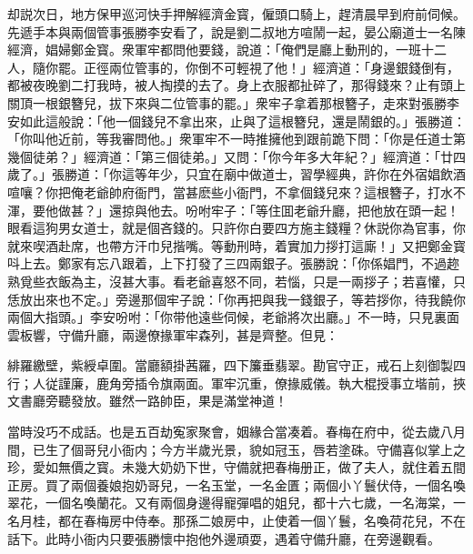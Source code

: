 却説次日，地方保甲巡河快手押解經濟金寳，僱頭口騎上，趕清晨早到府前伺候。先遞手本與兩個管事張勝李安看了，說是劉二叔地方喧鬧一起，晏公廟道士一名陳經濟，娼婦鄭金寳。衆軍牢都問他要錢，說道：「俺們是廳上動刑的，一班十二人，隨你罷。正徑兩位管事的，你倒不可輕視了他！」經濟道：「身邊銀錢倒有，都被夜晚劉二打我時，被人掏摸的去了。身上衣服都扯碎了，那得錢來？止有頭上關頂一根銀簪兒，拔下來與二位管事的罷。」衆牢子拿着那根簪子，走來對張勝李安如此這般說：「他一個錢兒不拿出來，止與了這根簪兒，還是鬧銀的。」張勝道：「你叫他近前，等我審問他。」衆軍牢不一時推擁他到跟前跪下問：「你是任道士第幾個徒弟？」經濟道：「第三個徒弟。」又問：「你今年多大年紀？」經濟道：「廿四歲了。」張勝道：「你這等年少，只宜在廟中做道士，習學經典，許你在外宿娼飲酒喧嚷？你把俺老爺帥府衙門，當甚麽些小衙門，不拿個錢兒來？這根簪子，打水不渾，要他做甚？」還掠與他去。吩咐牢子：「等住囬老爺升廳，把他放在頭一起！眼看這狗男女道士，就是個吝錢的。只許你白要四方施主錢糧？休説你為官事，你就來喫酒赴席，也帶方汗巾兒揩嘴。等動刑時，着實加力拶打這廝！」又把鄭金寳呌上去。鄭家有忘八跟着，上下打發了三四兩銀子。張勝說：「你係娼門，不過趂熟覓些衣飯為主，沒甚大事。看老爺喜怒不同，若惱，只是一兩拶子；若喜懽，只恁放出來也不定。」旁邊那個牢子說：「你再把與我一錢銀子，等若拶你，待我饒你兩個大指頭。」李安吩咐：「你带他遠些伺候，老爺將次出廳。」不一時，只見裏面雲板響，守備升廳，兩邊僚掾軍牢森列，甚是齊整。但見：

\begin{myquote}
緋羅繳壁，紫綬卓圍。當廳額掛茜羅，四下簾垂翡翠。勘官守正，戒石上刻御製四行；人従謹廉，鹿角旁插令旗兩面。軍牢沉重，僚掾威儀。執大棍授事立堦前，挾文書廳旁聽發放。雖然一路帥臣，果是滿堂神道！
\end{myquote}

當時没巧不成話。也是五百劫寃家聚會，姻緣合當凑着。春梅在府中，從去歲八月間，已生了個哥兒小衙内；今方半歲光景，貌如冠玉，唇若塗硃。守備喜似掌上之珍，愛如無價之寳。未幾大奶奶下世，守備就把春梅册正，做了夫人，就住着五間正房。買了兩個養娘抱奶哥兒，一名玉堂，一名金匱；兩個小丫鬟伏侍，一個名喚翠花，一個名喚蘭花。又有兩個身邊得寵彈唱的姐兒，都十六七歲，一名海棠，一名月桂，都在春梅房中侍奉。那孫二娘房中，止使着一個丫鬟，名喚荷花兒，不在話下。此時小衙内只要張勝懷中抱他外邊頑耍，遇着守備升廳，在旁邊觀看。

